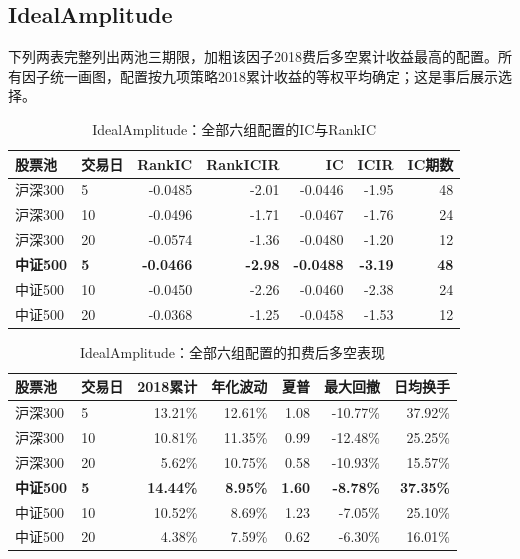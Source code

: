 \subsection{IdealAmplitude}
下列两表完整列出两池三期限，加粗该因子2018费后多空累计收益最高的配置。所有因子统一画图，配置按九项策略2018累计收益的等权平均确定；这是事后展示选择。
\begin{table}[H]\centering\normalsize\setlength{\tabcolsep}{3.5pt}
\caption{IdealAmplitude：全部六组配置的IC与RankIC}\begin{tabular}{llrrrrr}\toprule
股票池 & 交易日 & RankIC & RankICIR & IC & ICIR & IC期数\\\midrule
沪深300 & 5 & -0.0485 & -2.01 & -0.0446 & -1.95 & 48 \\
沪深300 & 10 & -0.0496 & -1.71 & -0.0467 & -1.76 & 24 \\
沪深300 & 20 & -0.0574 & -1.36 & -0.0480 & -1.20 & 12 \\
\textbf{中证500} & \textbf{5} & \textbf{-0.0466} & \textbf{-2.98} & \textbf{-0.0488} & \textbf{-3.19} & \textbf{48} \\
中证500 & 10 & -0.0450 & -2.26 & -0.0460 & -2.38 & 24 \\
中证500 & 20 & -0.0368 & -1.25 & -0.0458 & -1.53 & 12 \\
\bottomrule\end{tabular}\end{table}
\begin{table}[H]\centering\normalsize\setlength{\tabcolsep}{3.5pt}
\caption{IdealAmplitude：全部六组配置的扣费后多空表现}\begin{tabular}{llrrrrr}\toprule
股票池 & 交易日 & 2018累计 & 年化波动 & 夏普 & 最大回撤 & 日均换手\\\midrule
沪深300 & 5 & 13.21\% & 12.61\% & 1.08 & -10.77\% & 37.92\% \\
沪深300 & 10 & 10.81\% & 11.35\% & 0.99 & -12.48\% & 25.25\% \\
沪深300 & 20 & 5.62\% & 10.75\% & 0.58 & -10.93\% & 15.57\% \\
\textbf{中证500} & \textbf{5} & \textbf{14.44\%} & \textbf{8.95\%} & \textbf{1.60} & \textbf{-8.78\%} & \textbf{37.35\%} \\
中证500 & 10 & 10.52\% & 8.69\% & 1.23 & -7.05\% & 25.10\% \\
中证500 & 20 & 4.38\% & 7.59\% & 0.62 & -6.30\% & 16.01\% \\
\bottomrule\end{tabular}\end{table}
\clearpage
{}
\clearpage
